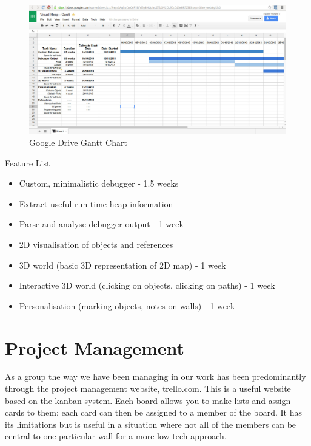 \documentclass[10pt, a4paper]{article}
\begin{document}
\begin{figure}[h]
        \centering
        \includegraphics[width=\textwidth]{images/gantt.jpg}
        \caption{Google Drive Gantt Chart}
\end{figure}

\noindent Feature List
\begin{itemize}

  \item Custom, minimalistic debugger - 1.5 weeks
  \item Extract useful run-time heap information
  \item Parse and analyse debugger output - 1 week
  \item 2D visualisation of objects and references 
  \item 3D world (basic 3D representation of 2D map) - 1 week
  \item Interactive 3D world (clicking on objects, clicking on paths) - 1 week
  \item Personalisation (marking objects, notes on walls) - 1 week

\end{itemize}

\section{Project Management}

As a group the way we have been managing in our work has been predominantly through the project management website, trello.com. This is a useful website based on the kanban system. Each board allows you to make lists and assign cards to them; each card can then be assigned to a member of the board. It has its limitations but is useful in a situation where not all of the members can be central to one particular wall for a more low-tech approach.
\end{document}
